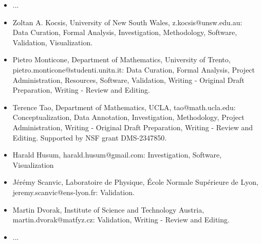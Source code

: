 \begin{itemize}
    \item ...
    \item Zoltan A. Kocsis, University of New South Wales, z.kocsis@unsw.edu.au: Data Curation, Formal Analysis, Investigation, Methodology, Software, Validation, Visualization.
    \item Pietro Monticone, Department of Mathematics, University of Trento, pietro.monticone@studenti.unitn.it: Data Curation, Formal Analysis, Project Administration, Resources, Software, Validation, Writing - Original Draft Preparation, Writing - Review and Editing.
    \item Terence Tao, Department of Mathematics, UCLA, tao@math.ucla.edu: Conceptualization, Data Annotation, Investigation, Methodology, Project Administration, Writing - Original Draft Preparation, Writing - Review and Editing. Supported by NSF grant DMS-2347850.
    \item Harald Husum, harald.husum@gmail.com: Investigation, Software, Visualization
    \item Jérémy Scanvic, Laboratoire de Physique, École Normale Supérieure de Lyon, jeremy.scanvic@ens-lyon.fr: Validation.
    \item Martin Dvorak, Institute of Science and Technology Austria, martin.dvorak@matfyz.cz: Validation, Writing - Review and Editing.
    \item ...
\end{itemize}

